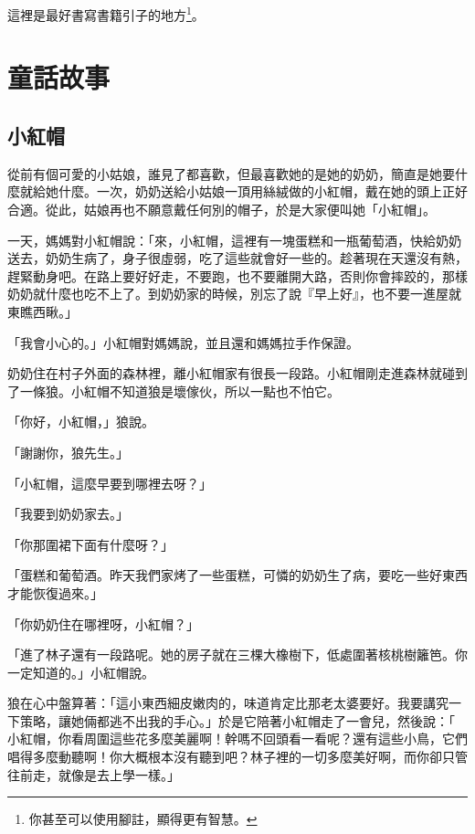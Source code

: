 \documentclass[oneside,11pt]{memoir} %
\begin{document}
這裡是最好書寫書籍引子的地方\footnote{你甚至可以使用腳註，顯得更有智慧。}。


\part{童話故事}


\chapter{小紅帽}

從前有個可愛的小姑娘，誰見了都喜歡，但最喜歡她的是她的奶奶，簡直是她要什
麼就給她什麼。一次，奶奶送給小姑娘一頂用絲絨做的小紅帽，戴在她的頭上正好
合適。從此，姑娘再也不願意戴任何別的帽子，於是大家便叫她「小紅帽」。

一天，媽媽對小紅帽說：「來，小紅帽，這裡有一塊蛋糕和一瓶葡萄酒，快給奶奶
送去，奶奶生病了，身子很虛弱，吃了這些就會好一些的。趁著現在天還沒有熱，
趕緊動身吧。在路上要好好走，不要跑，也不要離開大路，否則你會摔跤的，那樣
奶奶就什麼也吃不上了。到奶奶家的時候，別忘了說『早上好』，也不要一進屋就
東瞧西瞅。」

「我會小心的。」小紅帽對媽媽說，並且還和媽媽拉手作保證。

奶奶住在村子外面的森林裡，離小紅帽家有很長一段路。小紅帽剛走進森林就碰到
了一條狼。小紅帽不知道狼是壞傢伙，所以一點也不怕它。

「你好，小紅帽，」狼說。

「謝謝你，狼先生。」

「小紅帽，這麼早要到哪裡去呀？」

「我要到奶奶家去。」

「你那圍裙下面有什麼呀？」

「蛋糕和葡萄酒。昨天我們家烤了一些蛋糕，可憐的奶奶生了病，要吃一些好東西
才能恢復過來。」

「你奶奶住在哪裡呀，小紅帽？」

「進了林子還有一段路呢。她的房子就在三棵大橡樹下，低處圍著核桃樹籬笆。你
一定知道的。」小紅帽說。

狼在心中盤算著：「這小東西細皮嫩肉的，味道肯定比那老太婆要好。我要講究一
下策略，讓她倆都逃不出我的手心。」於是它陪著小紅帽走了一會兒，然後說：「
小紅帽，你看周圍這些花多麼美麗啊！幹嗎不回頭看一看呢？還有這些小鳥，它們
唱得多麼動聽啊！你大概根本沒有聽到吧？林子裡的一切多麼美好啊，而你卻只管
往前走，就像是去上學一樣。」
\end{document}
